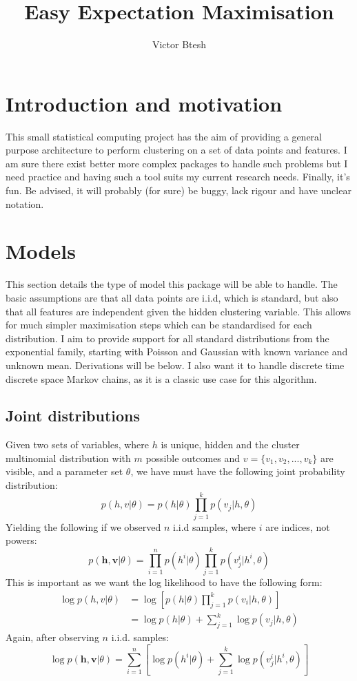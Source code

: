 \documentclass[]{article}
\title{Easy Expectation Maximisation}
\author{Victor Btesh}
\renewcommand{\vec}[1]{\mathbf{#1}}
\begin{document}
\maketitle

\section{Introduction and motivation}

This small statistical computing project has the aim of providing a general purpose architecture to perform clustering on a set of data points and features. I am sure there exist better more complex packages to handle such problems but I need practice and having such a tool suits my current research needs. Finally, it's fun. Be advised, it will probably (for sure) be buggy, lack rigour and have unclear notation.

\section{Models}

This section details the type of model this package will be able to handle. The basic assumptions are that all data points are i.i.d, which is standard, but also that all features are independent given the hidden clustering variable. This allows for much simpler maximisation steps which can be standardised for each distribution. I aim to provide support for all standard distributions from the exponential family, starting with Poisson and Gaussian with known variance and unknown mean. Derivations will be below. I also want it to handle discrete time discrete space Markov chains, as it is a classic use case for this algorithm.

\subsection{Joint distributions}

Given two sets of variables, where $h$ is unique, hidden and the cluster multinomial distribution with $m$ possible outcomes and $v = \{v_1, v_2, ..., v_k\}$ are visible, and a parameter set $\theta$, we have must have the following joint probability distribution:
\[
	p(h, v|\theta) = p(h|\theta) \prod_{j=1}^{k} p(v_j|h, \theta)
\]
Yielding the following if we observed $n$ i.i.d samples, where $i$ are indices, not powers:
\[
	p(\vec{h}, \vec{v}|\theta) = \prod_{i=1}^{n} p(h^i|\theta) \prod_{j=1}^{k} p(v_j^i|h^i, \theta)
\]
This is important as we want the log likelihood to have the following form:
\begin{align*}
	\log p(h, v|\theta) &= \log \left[ p(h|\theta) \prod_{j=1}^{k} p(v_i|h, \theta) \right] \\
	&= \log p(h|\theta) + \sum_{j=1}^{k} \log p(v_j|h, \theta)
\end{align*}
Again, after observing $n$ i.i.d. samples:
\[
	\log p(\vec{h}, \vec{v}|\theta) = \sum_{i=1}^{n}\left[ \log p(h^i|\theta) +  \sum_{j=1}^{k} \log p(v_j^i|h^i, \theta) \right]
\]
\end{document}
